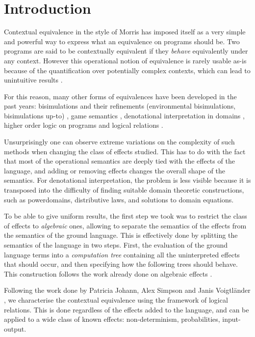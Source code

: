 \section{Introduction}

Contextual equivalence in the style of Morris
has imposed itself as a very simple and powerful
way to express what an equivalence on programs should be. 
Two programs are said to be contextually equivalent if 
they \emph{behave} equivalently under any context. 
However this operational notion of equivalence is rarely usable 
as-is because of the quantification over potentially complex 
contexts, which can lead to unintuitive results \cite{pitts1997operationally}.

For this reason, many other forms of equivalences have 
been developed in the past years: bisimulations 
and their refinements (environmental bisimulations, 
bisimulations up-to) \cite{koutavas2011applicative}, 
game semantics \cite{abramsky1999game}, 
denotational interpretation in domains \cite{scott1982domains}, 
higher order logic on 
programs \cite{honda2005observationally} 
and logical relations \cite{Pitts2000}.

Unsurprisingly one can observe extreme variations on 
the complexity of such methods when changing  
the class of effects studied. This has to do with 
the fact that most of the operational semantics 
are deeply tied with the effects of the language, 
and adding or removing effects changes the overall 
shape of the semantics. For denotational interpretation,
the problem is less visible because it is transposed 
into the difficulty of finding suitable domain theoretic constructions, 
such as powerdomains, distributive laws,
and solutions to domain equations.

To be able to give uniform results, the first 
step we took was to restrict the class of effects
to \emph{algebraic} ones, 
allowing to separate the semantics 
of the effects from the semantics of the ground language. 
This is effectively done by splitting the semantics of 
the language in two steps. First, the evaluation 
of the ground language terms into a \emph{computation tree}
containing all the uninterpreted effects that should occur, 
and then specifying how the following trees should behave.
This construction follows the work already done on 
algebraic effects \cite{plotkin2001adequacy}.


Following the work done by Patricia
Johann, Alex Simpson and Janis Voigtl\"ander \cite{gom}, we 
characterise the contextual equivalence using the framework 
of logical relations. This is done regardless of the 
effects added to the language, and can be applied to a wide 
class of known effects: non-determinism, probabilities, input-output.

